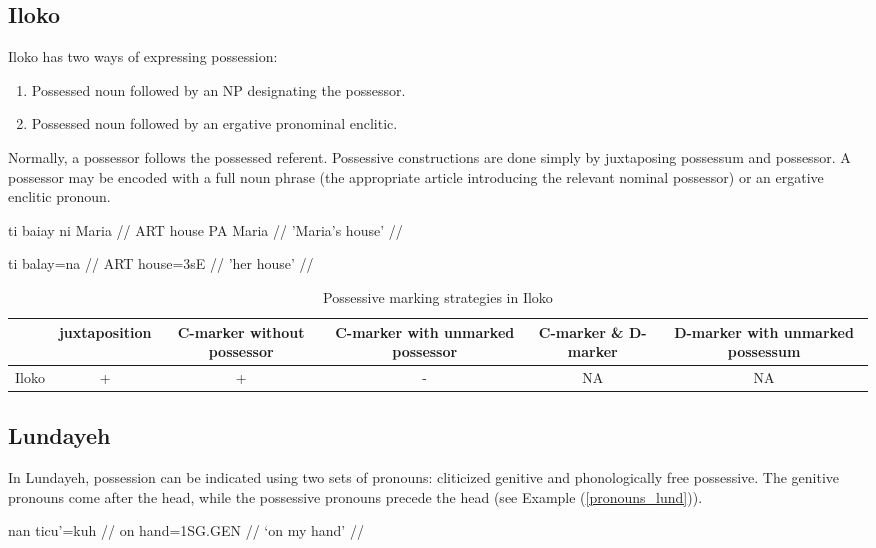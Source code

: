 \subsection{Iloko}

Iloko has two ways of expressing possession:
\begin{enumerate}
	\item Possessed noun followed by an NP designating the possessor.
	\item Possessed noun followed by an ergative pronominal enclitic.
\end{enumerate}

Normally, a possessor follows the possessed referent. Possessive constructions are done simply by juxtaposing possessum and possessor. A possessor may be encoded with a full noun phrase (the appropriate article introducing the relevant nominal possessor) or an ergative enclitic pronoun.

\pex
\a
\begingl
\gla ti baiay ni Maria  //
\glb ART house PA Maria  //
\glft 'Maria's house'  //
\endgl

\a
\begingl
\gla ti balay=na //
\glb ART house=3sE //
\glft 'her house' //
\endgl
\xe

\begin{table}[h!]
	\centering
	\small
	\begin{tabular}{@{}cccccc@{}}
		\toprule
		& juxtaposition & \parbox{2.5cm}{C-marker without possessor} & \parbox{2.75cm}{C-marker with unmarked possessor} & \parbox{1.75cm}{C-marker \& D-marker} & \parbox{3cm}{D-marker with unmarked possessum} \\ \midrule
		Iloko & + & + & - & NA & NA \\ \bottomrule
	\end{tabular}
	\caption{Possessive marking strategies in Iloko}
\end{table}

\subsection{Lundayeh}

In Lundayeh, possession can be indicated using two sets of pronouns: cliticized genitive and phonologically free possessive. The genitive pronouns come after the head, while the possessive pronouns precede the head (see Example (\ref{pronouns_lund})).

\pex\label{pronouns_lund}
\a
\begingl
\gla nan ticu’=kuh //
\glb on hand=1SG.GEN //
\glft `on my hand' //
\endgl

